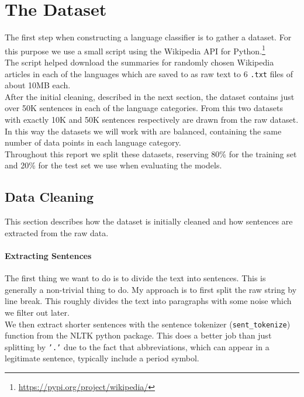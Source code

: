 
\section{The Dataset}
The first step when constructing a language classifier is to gather a dataset. For this purpose we use a small script using the Wikipedia API for Python.\footnote{\url{https://pypi.org/project/wikipedia/}}\\

The script helped download the summaries for randomly chosen Wikipedia articles in each of the languages which are saved to as raw text to 6 {\tt .txt} files of about 10MB each.\\

After the initial cleaning, described in the next section, the dataset contains just over 50K sentences in each of the language categories. From this two datasets with exactly 10K and 50K sentences respectively are drawn from the raw dataset. In this way the datasets we will work with are balanced, containing the same number of data points in each language category.\\

Throughout this report we split these datasets, reserving 80\% for the training set and 20\% for the test set we use when evaluating the models.\\

\subsection{Data Cleaning}
This section describes how the dataset is initially cleaned and how sentences are extracted from the raw data.\\

\paragraph{Extracting Sentences}

The first thing we want to do is to divide the text into sentences.
This is generally a non-trivial thing to do. My approach is to first split the raw string by line break.
This roughly divides the text into paragraphs with some noise which we filter out later.\\

We then extract shorter sentences with the sentence tokenizer ({\tt sent\_tokenize}) function from the NLTK\cite{nltk} python package. This does a better job than just splitting by {\tt '.'} due to the fact that abbreviations, which can appear in a legitimate sentence, typically include a period symbol.\\

